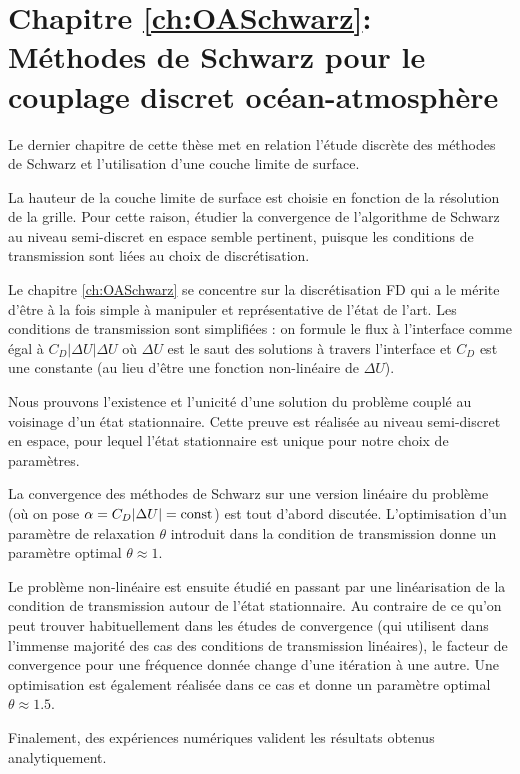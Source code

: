 \section*{Chapitre \ref{ch:OASchwarz}: Méthodes de Schwarz pour le couplage
discret océan-atmosphère}
Le dernier chapitre de cette thèse met en relation l'étude discrète
des méthodes de Schwarz et l'utilisation d'une couche limite de
surface.
	\par La hauteur de la couche limite de surface est
		choisie en fonction de la résolution de la grille.
		Pour cette raison, étudier la convergence de
		l'algorithme de Schwarz
		au niveau semi-discret en espace semble pertinent,
		puisque les conditions de transmission sont
		liées au choix de discrétisation.
	\par Le chapitre \ref{ch:OASchwarz} se concentre sur la discrétisation FD
		qui a le mérite d'être à la fois simple à
		manipuler et représentative de l'état de l'art.
		Les conditions de transmission sont simplifiées :
		on formule le flux à l'interface comme égal à
		$C_D |\Delta U| \Delta U$ où $\Delta U$ est le saut
		des solutions à travers l'interface et $C_D$ est
		une constante
		(au lieu d'être une fonction non-linéaire de
		$\Delta U$).
	\par Nous prouvons l'existence et l'unicité
	d'une solution du problème couplé au voisinage d'un état
		stationnaire. Cette preuve est réalisée au niveau
		semi-discret en espace, pour lequel l'état
		stationnaire est unique pour notre choix de
		paramètres.
	\par La convergence des méthodes de Schwarz sur une version
		linéaire du problème (où on pose
		$\alpha=C_D |\Delta U| = {\rm const}$)
		est tout d'abord discutée. L'optimisation d'un
		paramètre de relaxation $\theta$ introduit dans
		la condition de transmission donne un paramètre
		optimal $\theta \approx 1$.
	\par Le problème non-linéaire est ensuite étudié en passant
		par une linéarisation de la condition de transmission
		autour de l'état stationnaire. Au contraire
		de ce qu'on peut trouver habituellement dans
		les études de convergence (qui utilisent dans
		l'immense majorité des cas des conditions de
		transmission linéaires),
		le facteur de convergence pour une fréquence donnée
		change d'une itération à une autre. 
		Une optimisation est également réalisée dans ce cas
		et donne un paramètre optimal $\theta \approx 1.5$.
	\par Finalement, des expériences numériques
		valident les résultats obtenus analytiquement.
